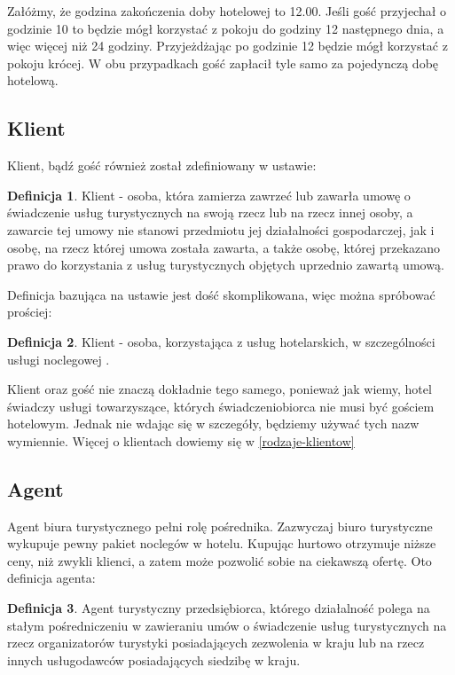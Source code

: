 \documentclass[a4paper,onecolumn,oneside,11pt,wide,floatssmall]{mwrep}
\theoremstyle{definition}
\newtheorem{defn}{Definicja}[section]
\theoremstyle{plain}%
\theoremstyle{remark}
\begin{document}
Załóżmy, że godzina zakończenia doby hotelowej to 12.00. Jeśli gość 
przyjechał o godzinie 10 to będzie mógł korzystać z pokoju do godziny 12 
następnego dnia, a więc więcej niż 24 godziny. Przyjeżdżając po godzinie 12 
będzie mógł korzystać z pokoju krócej. W obu przypadkach gość zapłacił tyle 
samo za pojedynczą dobę hotelową.


\subsection{Klient}

Klient, bądź gość również został zdefiniowany w ustawie\cite{ust:tur}:

\begin{defn}{Klient}
- osoba, która zamierza zawrzeć lub zawarła umowę o świadczenie usług 
turystycznych na swoją rzecz lub na rzecz innej osoby, a zawarcie tej umowy 
nie stanowi przedmiotu jej działalności gospodarczej, jak i osobę, na rzecz 
której umowa została zawarta, a także osobę, której przekazano prawo do 
korzystania z usług turystycznych objętych uprzednio zawartą umową.

\end{defn}

Definicja bazująca na ustawie jest dość skomplikowana, więc można spróbować 
prościej:

\begin{defn}{Klient}
- osoba, korzystająca z usług hotelarskich, w szczególności usługi noclegowej
.

\end{defn}

Klient oraz gość nie znaczą dokładnie tego samego, ponieważ jak wiemy, 
hotel świadczy usługi towarzyszące, których świadczeniobiorca nie musi być 
gościem hotelowym. Jednak nie wdając się w szczegóły, 
będziemy używać tych nazw wymiennie. Więcej o klientach dowiemy się w 
\ref{rodzaje-klientow}

\subsection{Agent}
Agent biura turystycznego pełni rolę pośrednika. Zazwyczaj biuro turystyczne 
wykupuje pewny pakiet noclegów w hotelu. Kupując hurtowo otrzymuje niższe 
ceny, niż zwykli klienci, a zatem może pozwolić sobie na ciekawszą ofertę. 
Oto definicja agenta\cite{ust:tur}:

\begin{defn}{Agent turystyczny}
przedsiębiorca, którego działalność polega na stałym pośredniczeniu w 
zawieraniu umów o świadczenie usług turystycznych na rzecz organizatorów 
turystyki posiadających zezwolenia w kraju lub na rzecz innych usługodawców 
posiadających siedzibę w kraju.
\end{defn}
\end{document}
